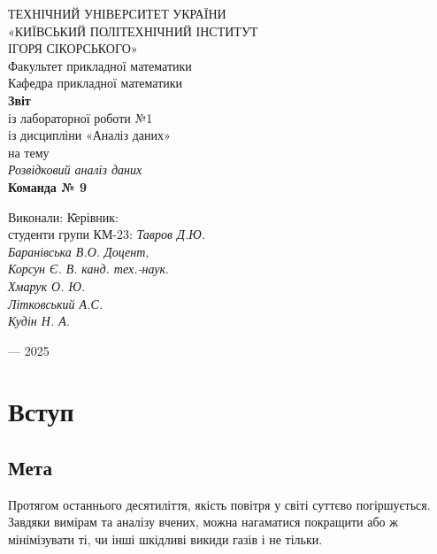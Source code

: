 \documentclass{article}
\begin{document}
\newpage
\begin{center}
   ТЕХНІЧНИЙ УНІВЕРСИТЕТ УКРАЇНИ\\
  \Large«КИЇВСЬКИЙ ПОЛІТЕХНІЧНИЙ ІНСТИТУТ\\
   ІГОРЯ СІКОРСЬКОГО»\\
  \vspace{1cm}
  Факультет прикладної математики\\
  Кафедра прикладної математики\\
  \vspace{3cm}
  \textbf{Звіт}\\
  \vspace{0.5cm}
  із лабораторної роботи №1\\
  із дисципліни «Аналіз даних»\\
  \vspace{1cm}
  на тему\\
  \textit{Розвідковий аналіз даних}\\
  \vspace{1.5cm}
  \textbf{Команда № 9}\\
  \vspace{2cm}
  \begin{tabbing}
    Виконали: \hspace{10cm} \= Керівник:\\
    студенти групи КМ-23: \> \textit{Тавров Д.Ю.}\\
    \textit{Баранівська В.О.} \> \textit{Доцент,}\\
    \textit{Корсун Є. В.} \> \textit{канд. тех.-наук}.\\
    \textit{Хмарук О. Ю.} \> \\
    \textit{Літковський А.С.} \>\\
    \textit{Кудін Н. А.} \> \\
  \end{tabbing}
  \vspace{3cm}
   — 2025\\
\end{center}

\newpage
\hypertarget{mytarget}{} %
\tableofcontents
\newpage

\section{Вступ}
\subsection{Мета}
Протягом останнього десятиліття, якість повітря у світі суттєво погіршується. Завдяки вимірам та аналізу вчених, можна нагаматися покращити або ж мінімізувати ті, чи інші шкідливі викиди газів і не тільки.
\end{document}
